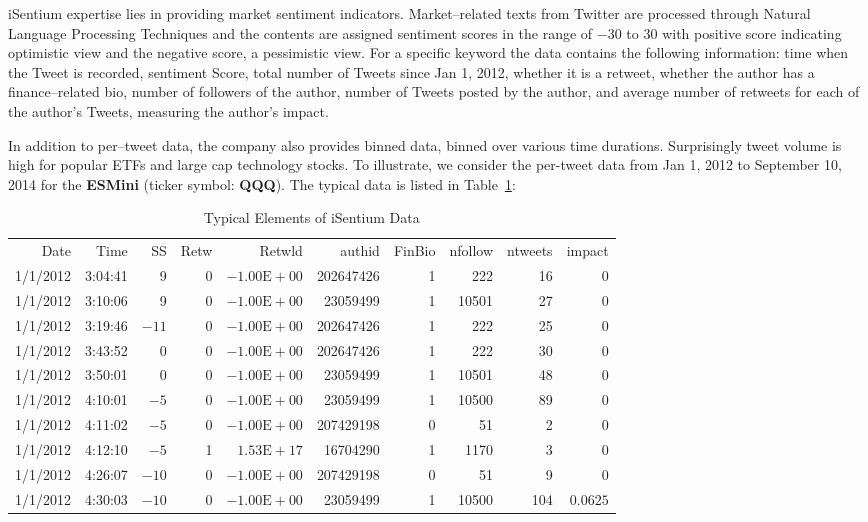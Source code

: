 iSentium expertise lies in providing market sentiment indicators. Market--related texts from Twitter are processed through Natural Language Processing Techniques and the contents are assigned sentiment scores in the range of $-30$ to $30$ with positive score indicating optimistic view and the negative score, a pessimistic view. For a specific keyword the data contains the following information: time when the Tweet is recorded, sentiment Score, total number of Tweets since Jan 1, 2012, whether it is a retweet, whether the author has a finance--related bio, number of followers of the author, number of Tweets posted by the author, and average number of retweets for each of the author's Tweets, measuring the author's impact.

In addition to per--tweet data, the company also provides binned data, binned over various time durations. Surprisingly tweet volume is high for popular ETFs and large cap technology stocks. To illustrate, we consider the per-tweet data from Jan 1, 2012 to September 10, 2014 for the \textbf{ESMini} (ticker symbol: \textbf{QQQ}). The typical data is listed in Table~\ref{tab:isentiumdata}:

        \begin{table}[!ht]
        \centering
        \caption{Typical Elements of iSentium Data \label{tab:isentiumdata}}
        \hspace*{-1.8cm}
        \begin{tabular}{rrrrrrrrrr}
        Date & Time & SS & Retw & Retwld & authid & FinBio & nfollow & ntweets & impact \\
        1/1/2012 & 3:04:41 & 9 & 0 & $-1.00\text{E}+00$ & 202647426 & 1 & 222 & 16 & 0 \\
        1/1/2012 & 3:10:06 & 9 & 0 & $-1.00\text{E}+00$ & 23059499 & 1 & 10501 & 27 & 0 \\
        1/1/2012 & 3:19:46 & $-11$ & 0 & $-1.00\text{E}+00$ & 202647426 & 1 & 222 & 25 & 0 \\
        1/1/2012 & 3:43:52 & 0 & 0 & $-1.00\text{E}+00$ & 202647426 & 1 & 222 & 30 & 0 \\
        1/1/2012 & 3:50:01 & 0 & 0 & $-1.00\text{E}+00$ & 23059499 & 1 & 10501 & 48 & 0 \\
        1/1/2012 & 4:10:01 & $-5$ & 0 & $-1.00\text{E}+00$ & 23059499 & 1 & 10500 & 89 & 0 \\
        1/1/2012 & 4:11:02 &  $-5$ & 0 & $-1.00\text{E}+00$ & 207429198 & 0 & 51 & 2 & 0 \\
        1/1/2012 & 4:12:10 &  $-5$ & 1 & $1.53\text{E}+17$ & 16704290 & 1& 1170 & 3 & 0 \\
        1/1/2012 & 4:26:07 & $-10$ & 0 & $-1.00\text{E}+00$ & 207429198 & 0 & 51 & 9 & 0 \\
        1/1/2012 & 4:30:03 & $-10$ & 0 & $-1.00\text{E}+00$ & 23059499 &	1 & 10500	 & 104 & $0.0625$ 
        \end{tabular}
        \end{table}


